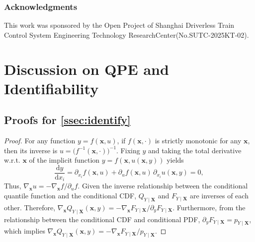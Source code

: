 \documentclass{article}
\theoremstyle{plain}
\theoremstyle{definition}
\theoremstyle{remark}
\begin{document}
\subsubsection*{Acknowledgments}
This work was sponsored by the Open Project of Shanghai Driverless Train Control System Engineering Technology ResearchCenter(No.SUTC-2025KT-02).%



\appendix
\newpage
\section{Discussion on QPE and Identifiability}

\subsection{Proofs for \cref{ssec:identify}}
\label{app:a_proofs}

\qpecdf*
\begin{proof}
For any function $y=f(\bm{x},u)$, if $f(\bm{x},\cdot)$ is strictly monotonic for any $\bm{x}$, then its inverse is $u=\big(f^{-1}(\bm{x},\cdot)\big)^{-1}$. Fixing $y$ and taking the total derivative w.r.t. $\bm{x}$ of the implicit function $y=f(\bm{x},u(\bm{x},y))$ yields
\[\frac{\text{d}y}{\text{d}x_i}=\partial_{x_i}f(\bm{x},u)+\partial_u f(\bm{x},u)\,\partial_{x_i}u(\bm{x},y)=0,\]
Thus, $\nabla_{\bm{x}} u=-\nabla_{\bm{x}} f/\partial_u f$. Given the inverse relationship between the conditional quantile function and the conditional CDF, $Q_{Y\mid\bm{X}}$ and $F_{Y\mid\bm{X}}$ are inverses of each other. Therefore, $\nabla_{\bm{x}}Q_{Y\mid\bm{X}}(\bm{x},y)=-\nabla_{\bm{x}}F_{Y\mid\bm{X}}/\partial_yF_{Y\mid\bm{X}}$. Furthermore, from the relationship between the conditional CDF and conditional PDF, $\partial_yF_{Y\mid\bm{X}}=p_{Y\mid\bm{X}}$, which implies $\nabla_{\bm{x}}Q_{Y\mid\bm{X}}(\bm{x},y)=-\nabla_{\bm{x}}F_{Y\mid\bm{X}}/p_{Y\mid\bm{X}}$.
\end{proof}
\end{document}
